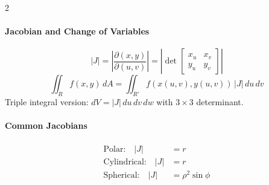 \begin{multicols}{2}
\paragraph{Jacobian and Change of Variables}
\[
|J| = \left|\frac{\partial(x,y)}{\partial(u,v)}\right| = \left|\det\begin{bmatrix} x_u & x_v \\ y_u & y_v \end{bmatrix}\right|
\]
\[
\iint_R f(x,y)\,dA = \iint_{R'} f(x(u,v),y(u,v))\,|J|\,du\,dv
\]
Triple integral version: $dV = |J|\,du\,dv\,dw$ with $3\times 3$ determinant.

\paragraph{Common Jacobians}
\begin{align*}
\text{Polar:}\quad |J| &= r \\
\text{Cylindrical:}\quad |J| &= r \\
\text{Spherical:}\quad |J| &= \rho^2\sin\phi
\end{align*}

\end{multicols}



\newpage


\practice{}

